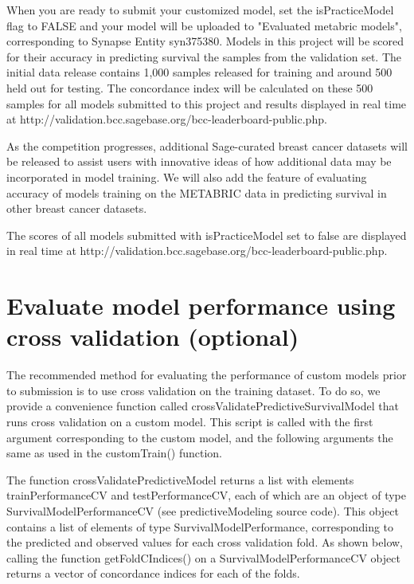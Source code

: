 \documentclass[10pt]{article}
\begin{document}
When you are ready to submit your customized model, set the isPracticeModel flag to FALSE and your model will be uploaded to "Evaluated metabric models", corresponding to Synapse Entity syn375380. Models in this project will be scored for their accuracy in predicting survival the samples from the validation set. The initial data release contains 1,000 samples released for training and around 500 held out for testing. The concordance index will be calculated on these 500 samples for all models submitted to this project and results displayed in real time at http://validation.bcc.sagebase.org/bcc-leaderboard-public.php.

As the competition progresses, additional Sage-curated breast cancer datasets will be released to assist users with innovative ideas of how additional data may be incorporated in model training. We will also add the feature of evaluating accuracy of models training on the METABRIC data in predicting survival in other breast cancer datasets.

The scores of all models submitted with isPracticeModel set to false are displayed in real time at http://validation.bcc.sagebase.org/bcc-leaderboard-public.php.

\section{Evaluate model performance using cross validation (optional)}
The recommended method for evaluating the performance of custom models prior to submission is to use cross validation on the training dataset. To do so, we provide a convenience function called crossValidatePredictiveSurvivalModel that runs cross validation on a custom model. This script is called with the first argument corresponding to the custom model, and the following arguments the same as used in the customTrain() function.

The function crossValidatePredictiveModel returns a list with elements trainPerformanceCV and testPerformanceCV, each of which are an object of type SurvivalModelPerformanceCV (see predictiveModeling source code). This object contains a list of elements of type SurvivalModelPerformance, corresponding to the predicted and observed values for each cross validation fold. As shown below, calling the function getFoldCIndices() on a SurvivalModelPerformanceCV object returns a vector of concordance indices for each of the folds.
\end{document}
